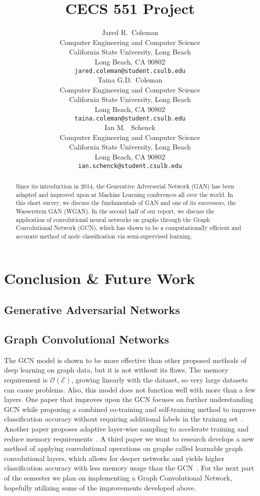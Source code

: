 \documentclass{article}
\title{CECS 551 Project}
\author{%
  Jared R.~Coleman\\
  Computer Engineering and Computer Science\\
  California State University, Long Beach\\
  Long Beach, CA 90802 \\
  \texttt{jared.coleman@student.csulb.edu} \\
  \And 
  Taina G.D.~Coleman\\
  Computer Engineering and Computer Science\\
  California State University, Long Beach\\
  Long Beach, CA 90802 \\
  \texttt{taina.coleman@student.csulb.edu} \\
  \And 
  Ian M. ~Schenck\\
  Computer Engineering and Computer Science\\
  California State University, Long Beach\\
  Long Beach, CA 90802 \\
  \texttt{ian.schenck@student.csulb.edu} \\
}
\begin{document}
\setcounter{equation}{0}

\maketitle

\begin{abstract}
   Since its introduction in 2014, the Generative Adverserial Network (GAN) has been adapted and improved upon at Machine Learning conferences all over the world. In this short survey, we discuss the fundamentals of GAN and one of its successors, the Wasserstein GAN (WGAN). In the second half of our report, we discuss the application of convolutional neural networks on graphs through the Graph Convolutional Network (GCN), which has shown to be a computationally efficient and accurate method of node classification via semi-supervised learning.
\end{abstract}






\section{Conclusion \& Future Work}
  \subsection{Generative Adversarial Networks}
  \subsection{Graph Convolutional Networks}
  The GCN model is shown to be more effective than other proposed methods of deep learning on graph data, but it is not without its flaws. The memory requirement is $\mathcal{O}(\mathcal{E})$, growing linearly with the dataset, so very large datasets can cause problems. Also, this model does not function well with more than a few layers. One paper that improves upon the GCN focuses on further understanding GCN while proposing a combined co-training and self-training method to improve classification accuracy without requiring additional labels in the training set~\cite{Li2018}. Another paper proposes adaptive layer-wise sampling to accelerate training and reduce memory requirements~\cite{Huang2018}. A third paper we want to research develops a new method of applying convolutional operations on graphs called learnable graph convolutional layers, which allows for deeper networks and yields higher classification accuracy with less memory usage than the GCN~\cite{Gao2018}. For the next part of the semester we plan on implementing a Graph Convolutional Network, hopefully utilizing some of the improvements developed above.
  



\end{document}

